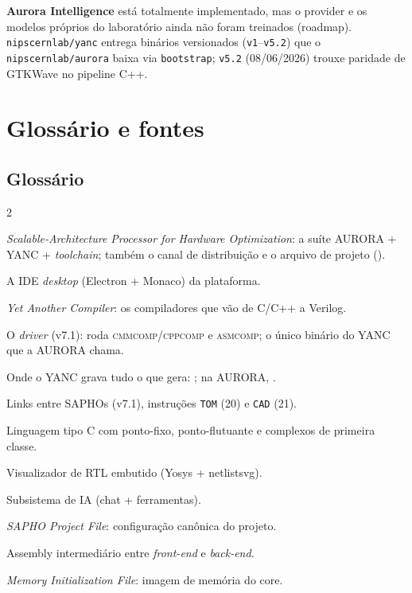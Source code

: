\documentclass[11pt,a4paper,oneside]{article}
\newcommand{\cmm}{C\textpm{}}
\newcommand{\repo}[1]{\texttt{nipscernlab/#1}}
\newcommand{\file}[1]{\path{#1}}
\newcommand{\tool}[1]{\textsc{#1}}
\newcommand{\code}[1]{\lstinline[basicstyle=\ttfamily]|#1|}
\begin{document}
\noindent\textbf{Aurora Intelligence} está totalmente implementado, mas o provider e os modelos próprios do laboratório ainda não foram treinados (roadmap). \repo{yanc} entrega binários versionados (\code{v1}--\code{v5.2}) que o \repo{aurora} baixa via \code{bootstrap}; \code{v5.2} (08/06/2026) trouxe paridade de GTKWave no pipeline C++.
\section{Glossário e fontes}
\label{sec:glossario}

\subsection*{Glossário}
{\footnotesize
\begin{multicols}{2}
\begin{description}[style=nextline,leftmargin=0pt,font=\bfseries\ttfamily,itemsep=1pt]
\item[SAPHO] \textit{Scalable-Architecture Processor for Hardware Optimization}: a suíte AURORA + YANC +
\textit{toolchain}; também o canal de distribuição e o arquivo de projeto (\file{.spf}).
\item[AURORA] A IDE \textit{desktop} (Electron + Monaco) da plataforma.
\item[YANC] \textit{Yet Another Compiler}: os compiladores que vão de \cmm{}/C++ a Verilog.
\item[yanc] O \textit{driver} (v7.1): roda \tool{cmmcomp}/\tool{cppcomp} e \tool{asmcomp}; o único binário do YANC que a AURORA chama.
\item[pasta de saída] Onde o YANC grava tudo o que gera: ; na AURORA, .
\item[toma / cade] Links entre SAPHOs (v7.1), instruções \lstinline|TOM| (20) e \lstinline|CAD| (21).
\item[\cmm{}] Linguagem tipo C com ponto-fixo, ponto-flutuante e complexos de primeira classe.
\item[PRISM] Visualizador de RTL embutido (Yosys + netlistsvg).
\item[Aurora Intelligence] Subsistema de IA (chat + ferramentas).
\item[\file{.spf}] \textit{SAPHO Project File}: configuração canônica do projeto.
\item[\file{.asm}] Assembly intermediário entre \textit{front-end} e \textit{back-end}.
\item[\file{.mif}] \textit{Memory Initialization File}: imagem de memória do core.

\end{description}
\end{multicols}}
\end{document}

